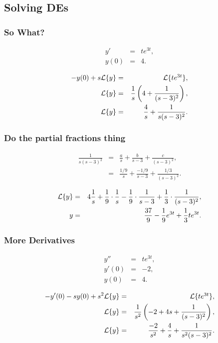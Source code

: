 \subsection{Solving DEs}

\begin{frame}
  \frametitle{So What?}

  \begin{eqnarray*}
    y' & = & t e^{3t}, \\
    y(0) & = & 4.
  \end{eqnarray*}

  {
    \begin{eqnarray*}
      -y(0) + s \laplace{y} & = & \laplace{t e^{3t}}, \\
      \laplace{y} & = & \frac{1}{s} \lp 4 + \frac{1}{(s-3)^2} \rp, \\
      \laplace{y} & = & \frac{4}{s} + \frac{1}{s(s-3)^2}.
    \end{eqnarray*}
  }


\end{frame}


\begin{frame}
  \frametitle{Do the partial fractions thing}

  \begin{eqnarray*}
    \frac{1}{s(s-3)^2} & = & \frac{a}{s} + \frac{b}{s-3} + \frac{c}{(s-3)^2}, \\
    & = & \frac{1/9}{s} + \frac{-1/9}{s-3} + \frac{1/3}{(s-3)^2}.
  \end{eqnarray*}

  {
    \begin{eqnarray*}
      \laplace{y} & = & 4 \frac{1}{s} + \frac{1}{9}\cdot\frac{1}{s}  - \frac{1}{9}\cdot\frac{1}{s-3} +
      \frac{1}{3}\cdot\frac{1}{(s-3)^2}, \\
      y & = & \frac{37}{9}  - \frac{1}{9}e^{3t} + \frac{1}{3} t e^{3t}.
    \end{eqnarray*}
  }

\end{frame}


\begin{frame}
  \frametitle{More Derivatives}

  \begin{eqnarray*}
    y'' & = & t e^{3t}, \\
    y'(0) & = & -2, \\
    y(0) & = & 4.
  \end{eqnarray*}

  {
    \begin{eqnarray*}
      -y'(0) - s y(0) + s^2 \laplace{y} & = & \laplace{t e^{3t}}, \\
      \laplace{y} & = & \frac{1}{s^2} \lp -2 + 4s + \frac{1}{(s-3)^2} \rp, \\
      \laplace{y} & = & \frac{-2}{s^2} + \frac{4}{s} + \frac{1}{s^2(s-3)^2}.
    \end{eqnarray*}
  }


\end{frame}


